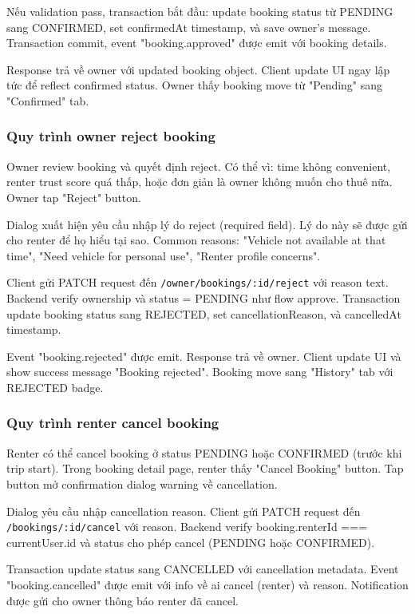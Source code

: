 Nếu validation pass, transaction bắt đầu: update booking status từ PENDING sang CONFIRMED, set confirmedAt timestamp, và save owner's message. Transaction commit, event "booking.approved" được emit với booking details.

Response trả về owner với updated booking object. Client update UI ngay lập tức để reflect confirmed status. Owner thấy booking move từ "Pending" sang "Confirmed" tab.

\subsubsection{Quy trình owner reject booking}
Owner review booking và quyết định reject. Có thể vì: time không convenient, renter trust score quá thấp, hoặc đơn giản là owner không muốn cho thuê nữa. Owner tap "Reject" button.

Dialog xuất hiện yêu cầu nhập lý do reject (required field). Lý do này sẽ được gửi cho renter để họ hiểu tại sao. Common reasons: "Vehicle not available at that time", "Need vehicle for personal use", "Renter profile concerns".

Client gửi PATCH request đến \texttt{/owner/bookings/:id/reject} với reason text. Backend verify ownership và status = PENDING như flow approve. Transaction update booking status sang REJECTED, set cancellationReason, và cancelledAt timestamp.

Event "booking.rejected" được emit. Response trả về owner. Client update UI và show success message "Booking rejected". Booking move sang "History" tab với REJECTED badge.

\subsubsection{Quy trình renter cancel booking}
Renter có thể cancel booking ở status PENDING hoặc CONFIRMED (trước khi trip start). Trong booking detail page, renter thấy "Cancel Booking" button. Tap button mở confirmation dialog warning về cancellation.

Dialog yêu cầu nhập cancellation reason. Client gửi PATCH request đến \texttt{/bookings/:id/cancel} với reason. Backend verify booking.renterId === currentUser.id và status cho phép cancel (PENDING hoặc CONFIRMED).

Transaction update status sang CANCELLED với cancellation metadata. Event "booking.cancelled" được emit với info về ai cancel (renter) và reason. Notification được gửi cho owner thông báo renter đã cancel.

